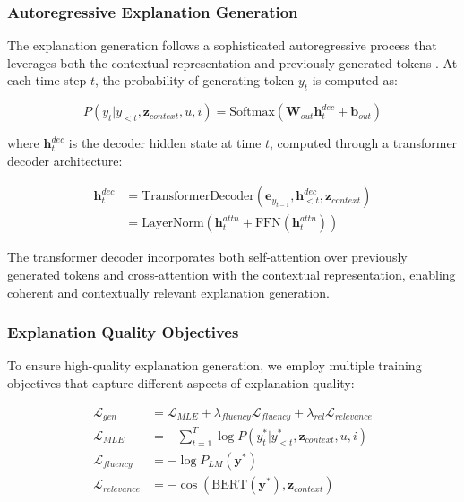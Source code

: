 \documentclass[pdflatex,sn-mathphys-num]{sn-jnl}%
\theoremstyle{thmstyleone}%
\theoremstyle{thmstyletwo}%
\theoremstyle{thmstylethree}%
\begin{document}
\subsubsection{Autoregressive Explanation Generation}

The explanation generation follows a sophisticated autoregressive process that leverages both the contextual representation and previously generated tokens \cite{vaswani2017attention}. At each time step $t$, the probability of generating token $y_t$ is computed as:

\begin{equation}
P(y_t | y_{<t}, \mathbf{z}_{context}, u, i) = \text{Softmax}(\mathbf{W}_{out} \mathbf{h}_t^{dec} + \mathbf{b}_{out})
\end{equation}

where $\mathbf{h}_t^{dec}$ is the decoder hidden state at time $t$, computed through a transformer decoder architecture:

\begin{align}
\mathbf{h}_t^{dec} &= \text{TransformerDecoder}(\mathbf{e}_{y_{t-1}}, \mathbf{h}_{<t}^{dec}, \mathbf{z}_{context}) \\
&= \text{LayerNorm}(\mathbf{h}_t^{attn} + \text{FFN}(\mathbf{h}_t^{attn}))
\end{align}

The transformer decoder incorporates both self-attention over previously generated tokens and cross-attention with the contextual representation, enabling coherent and contextually relevant explanation generation.

\subsubsection{Explanation Quality Objectives}

To ensure high-quality explanation generation, we employ multiple training objectives that capture different aspects of explanation quality:

\begin{align}
\mathcal{L}_{gen} &= \mathcal{L}_{MLE} + \lambda_{fluency} \mathcal{L}_{fluency} + \lambda_{rel} \mathcal{L}_{relevance} \\
\mathcal{L}_{MLE} &= -\sum_{t=1}^{T} \log P(y_t^* | y_{<t}^*, \mathbf{z}_{context}, u, i) \\
\mathcal{L}_{fluency} &= -\log P_{LM}(\mathbf{y}^*) \\
\mathcal{L}_{relevance} &= -\cos(\text{BERT}(\mathbf{y}^*), \mathbf{z}_{context})
\end{align}
\end{document}
